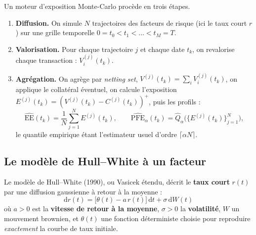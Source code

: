\documentclass[11pt,a4paper]{article}
\newcommand{\PFE}{\mathrm{PFE}}
\newcommand{\EE}{\mathrm{EE}}
\newcommand{\dd}{\mathrm{d}}
\theoremstyle{remark}
\begin{document}
Un moteur d'exposition Monte-Carlo procède en trois étapes.
\begin{enumerate}[nosep]
  \item \textbf{Diffusion.} On simule $N$ trajectoires des facteurs de risque (ici le taux court $r$) sur une grille temporelle $0 = t_0 < t_1 < \dots < t_M = T$.
  \item \textbf{Valorisation.} Pour chaque trajectoire $j$ et chaque date $t_k$, on revalorise chaque transaction : $V_i^{(j)}(t_k)$.
  \item \textbf{Agrégation.} On agrège par \emph{netting set}, $V^{(j)}(t_k) = \sum_i V_i^{(j)}(t_k)$, on applique le collatéral éventuel, on calcule l'exposition $E^{(j)}(t_k) = (V^{(j)}(t_k) - C^{(j)}(t_k))^{+}$, puis les profils :
  \begin{equation}
  \widehat{\EE}(t_k) = \frac{1}{N}\sum_{j=1}^N E^{(j)}(t_k), \qquad
  \widehat{\PFE}_\alpha(t_k) = \widehat{Q}_\alpha\big(\{E^{(j)}(t_k)\}_{j=1}^N\big),
  \end{equation}
  le quantile empirique étant l'estimateur usuel d'ordre $\lceil \alpha N\rceil$.
\end{enumerate}

\subsection{Le modèle de Hull--White à un facteur}

Le modèle de Hull--White (1990), ou Vasicek étendu, décrit le \textbf{taux court} $r(t)$ par une diffusion gaussienne à retour à la moyenne :
\begin{equation}
\boxed{\;\dd r(t) = \big[\theta(t) - a\, r(t)\big]\,\dd t + \sigma\, \dd W(t)\;}
\end{equation}
où $a > 0$ est la \textbf{vitesse de retour à la moyenne}, $\sigma > 0$ la \textbf{volatilité}, $W$ un mouvement brownien, et $\theta(t)$ une fonction déterministe choisie pour reproduire \emph{exactement} la courbe de taux initiale.
\end{document}
